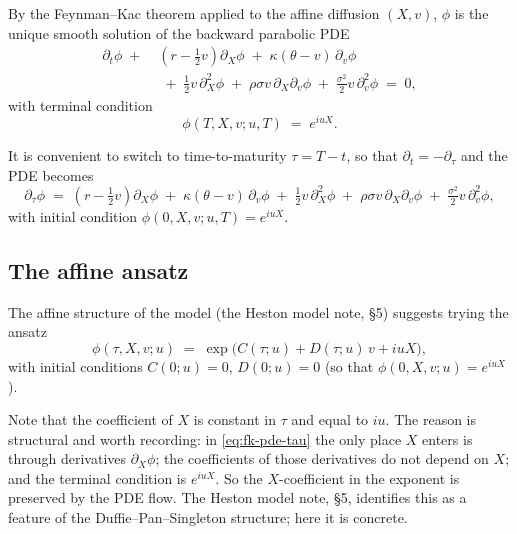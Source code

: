 \documentclass[11pt]{article}
\theoremstyle{plain}
\theoremstyle{definition}
\theoremstyle{remark}
\begin{document}
By the Feynman--Kac theorem applied to the affine diffusion \((X, v)\), \(\phi\) is the unique smooth solution of the backward parabolic PDE
\begin{equation}
    \begin{aligned}
        \partial_t \phi \;+\; & \left(r - \tfrac12 v\right) \partial_X \phi \;+\; \kappa(\theta - v)\, \partial_v \phi \\
        & \;+\; \tfrac12 v\, \partial^2_X \phi \;+\; \rho\sigma v\, \partial_X \partial_v \phi \;+\; \tfrac{\sigma^2}{2} v\, \partial^2_v \phi \;=\; 0,
    \end{aligned}                                                                                \label{eq:fk-pde}
\end{equation}
with terminal condition
\[
    \phi(T, X, v; u, T) \;=\; e^{i u X}.
\]

It is convenient to switch to time-to-maturity \(\tau = T - t\), so that \(\partial_t = -\partial_\tau\) and the PDE becomes
\begin{equation}
    \partial_\tau \phi \;=\; \left(r - \tfrac12 v\right) \partial_X \phi \;+\; \kappa(\theta - v)\, \partial_v \phi \;+\; \tfrac12 v\, \partial^2_X \phi \;+\; \rho\sigma v\, \partial_X \partial_v \phi \;+\; \tfrac{\sigma^2}{2} v\, \partial^2_v \phi,                                       \label{eq:fk-pde-tau}
\end{equation}
with initial condition \(\phi(0, X, v; u, T) = e^{i u X}\).

\subsection{The affine ansatz}

The affine structure of the model (the Heston model note, \S5) suggests trying the ansatz
\begin{equation}
    \phi(\tau, X, v; u) \;=\; \exp\!\bigl(C(\tau; u) + D(\tau; u)\, v + i u X\bigr),                  \label{eq:ansatz}
\end{equation}
with initial conditions \(C(0; u) = 0\), \(D(0; u) = 0\) (so that \(\phi(0, X, v; u) = e^{i u X}\)).

Note that the coefficient of \(X\) is constant in \(\tau\) and equal to \(i u\). The reason is structural and worth recording: in \eqref{eq:fk-pde-tau} the only place \(X\) enters is through derivatives \(\partial_X \phi\); the coefficients of those derivatives do not depend on \(X\); and the terminal condition is \(e^{iuX}\). So the \(X\)-coefficient in the exponent is preserved by the PDE flow. The Heston model note, \S5, identifies this as a feature of the Duffie--Pan--Singleton structure; here it is concrete.
\end{document}
